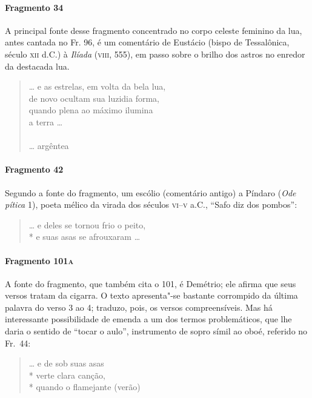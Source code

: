 {\paragraph{Fragmento 34}

{\small A principal fonte desse fragmento concentrado no corpo celeste feminino da lua, antes cantada no Fr. 96, é
um comentário de Eustácio (bispo de Tessalônica, século \textsc{xii} d.C.) à
\textit{Ilíada }(\textsc{viii}, 555), em passo sobre o brilho dos astros no enredor da destacada lua.} %

\begin{verse}
\ldots{} e as estrelas, em volta da bela lua,\\
de novo ocultam sua luzidia forma,\\
quando plena ao máximo ilumina\\
a terra \ldots{}\\
\ast\quad\ast\quad\ast\\
\ldots{} argêntea
\end{verse}

\paragraph{Fragmento 42}

{\small Segundo a fonte do fragmento, um escólio (comentário antigo) a Píndaro
(\textit{Ode pítica} 1), poeta mélico da virada dos séculos \textsc{vi}--\textsc{v} a.C.,
``Safo diz dos pombos”:}

\begin{verse}
\ldots{} e deles se tornou frio o peito,\\*
e suas asas se afrouxaram \ldots{}
\end{verse}

\paragraph{Fragmento 101\textsc{a}}

{\small A fonte do fragmento, que também cita o 101, é Demétrio; ele afirma que seus versos tratam da cigarra. O texto apresenta"-se bastante corrompido da última palavra do verso 3 ao 4; traduzo, pois, os versos compreensíveis. Mas há interessante possibilidade de emenda a um dos termos problemáticos, que lhe daria o sentido de ``tocar o aulo'', instrumento de sopro símil ao oboé, referido no Fr.~44:}


\begin{verse}
\ldots{} e de sob suas asas\\*
verte clara canção,\\*
quando o flamejante (verão)
\end{verse}

}
